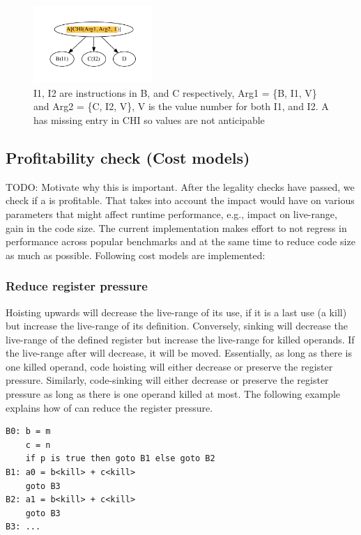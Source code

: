 \documentclass[sigplan,10pt,review,anonymous]{acmart}\settopmatter{printfolios=true,printccs=false,printacmref=false}
\begin{document}
\begin{figure}
  \includegraphics[width=0.4\textwidth]{chi-example2.pdf}
  \vspace*{-1.0cm}
\caption{I1, I2 are instructions in B, and C respectively, Arg1 = \{B, I1, V\}
  and Arg2 = \{C, I2, V\}, V is the value number for both I1, and I2. A has
  missing entry in CHI so values are not anticipable}
\label{fig:chi-intro2}
\end{figure}


\subsection{Profitability check (Cost models)}
\label{subsec:cost-models}
TODO: Motivate why this is important.
After the legality checks have passed, we check if a \gcm{} is profitable.  That
takes into account the impact \gcm{} would have on various parameters that might
affect runtime performance, e.g., impact on live-range, gain in the code
size. The current implementation makes effort to not regress in performance
across popular benchmarks and at the same time to reduce code size as much as
possible. Following cost models are implemented:

\subsubsection{Reduce register pressure}
\label{hoist:reg-pressure}
Hoisting upwards will decrease the live-range of its use, if it is a last use (a
kill) but increase the live-range of its definition. Conversely, sinking will
decrease the live-range of the defined register but increase the live-range for
killed operands. If the live-range after \GCM{} will decrease, it will be
moved. Essentially, as long as there is one killed operand, code hoisting will
either decrease or preserve the register pressure.  Similarly, code-sinking will
either decrease or preserve the register pressure as long as there is one
operand killed at most.  The following example explains how \GCM{} of can reduce
the register pressure.

\begin{verbatim}
B0: b = m
    c = n
    if p is true then goto B1 else goto B2
B1: a0 = b<kill> + c<kill>
    goto B3
B2: a1 = b<kill> + c<kill>
    goto B3
B3: ...
\end{verbatim}
\end{document}
